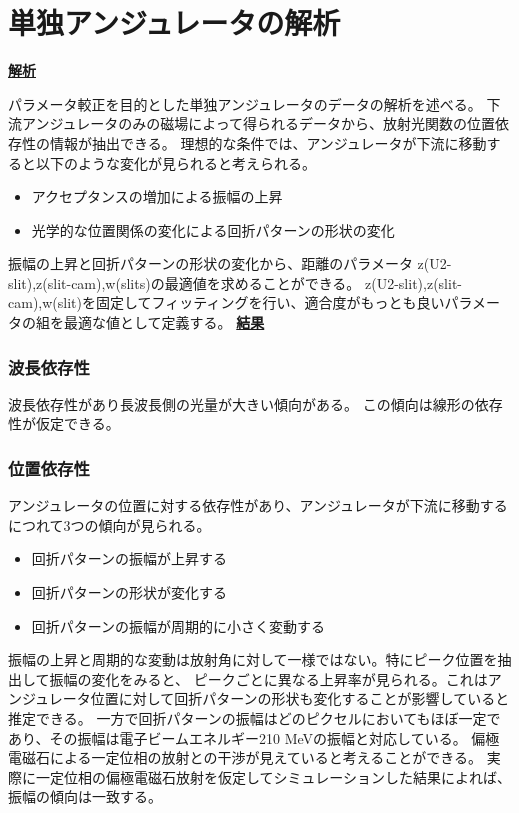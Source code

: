 \documentclass[a4paper,11pt,uplatex]{jsbook}
\begin{document}
\section{単独アンジュレータの解析}
\noindent \textbf{\underline{解析}}\par
パラメータ較正を目的とした単独アンジュレータのデータの解析を述べる。
下流アンジュレータのみの磁場によって得られるデータから、放射光関数の位置依存性の情報が抽出できる。
理想的な条件では、アンジュレータが下流に移動すると以下のような変化が見られると考えられる。
\begin{itemize}
  \item アクセプタンスの増加による振幅の上昇
  \item 光学的な位置関係の変化による回折パターンの形状の変化
\end{itemize}

振幅の上昇と回折パターンの形状の変化から、距離のパラメータ z(U2-slit),z(slit-cam),w(slits)の最適値を求めることができる。
z(U2-slit),z(slit-cam),w(slit)を固定してフィッティングを行い、適合度がもっとも良いパラメータの組を最適な値として定義する。
\noindent \textbf{\underline{結果}}\par

\subsubsection{波長依存性}
波長依存性があり長波長側の光量が大きい傾向がある。
この傾向は線形の依存性が仮定できる。\\
\subsubsection{位置依存性}
アンジュレータの位置に対する依存性があり、アンジュレータが下流に移動するにつれて3つの傾向が見られる。
\begin{itemize}
  \item 回折パターンの振幅が上昇する
  \item 回折パターンの形状が変化する
  \item 回折パターンの振幅が周期的に小さく変動する
\end{itemize}
振幅の上昇と周期的な変動は放射角に対して一様ではない。特にピーク位置を抽出して振幅の変化をみると、
ピークごとに異なる上昇率が見られる。これはアンジュレータ位置に対して回折パターンの形状も変化することが影響していると推定できる。
一方で回折パターンの振幅はどのピクセルにおいてもほぼ一定であり、その振幅は電子ビームエネルギー210 MeVの振幅と対応している。
偏極電磁石による一定位相の放射との干渉が見えていると考えることができる。
実際に一定位相の偏極電磁石放射を仮定してシミュレーションした結果によれば、振幅の傾向は一致する。\\
\end{document}
